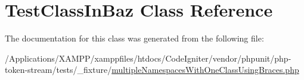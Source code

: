\hypertarget{class_foo_1_1_baz_1_1_test_class_in_baz}{}\section{Test\+Class\+In\+Baz Class Reference}
\label{class_foo_1_1_baz_1_1_test_class_in_baz}


The documentation for this class was generated from the following file\+:\begin{DoxyCompactItemize}
\item 
/\+Applications/\+X\+A\+M\+P\+P/xamppfiles/htdocs/\+Code\+Igniter/vendor/phpunit/php-\/token-\/stream/tests/\+\_\+fixture/\mbox{\hyperlink{multiple_namespaces_with_one_class_using_braces_8php}{multiple\+Namespaces\+With\+One\+Class\+Using\+Braces.\+php}}\end{DoxyCompactItemize}
